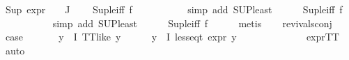 \begin{isabellebody}
\ {\isachardoublequoteopen}Sup\ {\isacharparenleft}{\kern0pt}{\isacharparenleft}{\kern0pt}expr{\isacharunderscore}{\kern0pt}{}\ {\isasymcirc}\ {\isasymPhi}{\isacharparenright}{\kern0pt}\ {\isacharbackquote}{\kern0pt}\ J{\isacharparenright}{\kern0pt}\ {\isasymle}\ {}{\isachardoublequoteclose}\ \isanewline
{}\isamarkupfalse%
\ Sup{\isacharunderscore}{\kern0pt}le{\isacharunderscore}{\kern0pt}iff\ f{}\isanewline
\ \ \ \ \ \ \ \ \ \isamarkupfalse%
\ {\isacharparenleft}{\kern0pt}simp\ add{\isacharcolon}{\kern0pt}\ SUP{\isacharunderscore}{\kern0pt}least{\isacharparenright}{\kern0pt}\isanewline
\ \ \ \ \isamarkupfalse%
\ Sup{\isacharunderscore}{\kern0pt}le{\isacharunderscore}{\kern0pt}iff\ f{}\isanewline
\ \ \ \ \ \ \ \ \ \isamarkupfalse%
\ {\isacharparenleft}{\kern0pt}simp\ add{\isacharcolon}{\kern0pt}\ SUP{\isacharunderscore}{\kern0pt}least{\isacharparenright}{\kern0pt}\isanewline
\ \ \ \ \isamarkupfalse%
\ Sup{\isacharunderscore}{\kern0pt}le{\isacharunderscore}{\kern0pt}iff\ f{}\isanewline
\ \ \ \ \isamarkupfalse%
\ {\isacharparenleft}{\kern0pt}metis{\isacharparenright}{\kern0pt}{\isacharplus}{\kern0pt}\isanewline
\ \ \isamarkupfalse%
\ revivals{\isacharunderscore}{\kern0pt}conj{\isacharparenleft}{\kern0pt}{}{\isacharparenright}{\kern0pt}\ \isamarkupfalse%
\ {\isacharquery}{\kern0pt}case\ \isamarkupfalse%
\isanewline
\ \ \ \ \isamarkupfalse%
\ {\isachardoublequoteopen}{\isasymforall}y{\isasymin}{\isasymPhi}\ {\isacharbackquote}{\kern0pt}\ I{\isachardot}{\kern0pt}\ TT{\isacharunderscore}{\kern0pt}like\ y{\isachardoublequoteclose}\isanewline
\ \ \ \ \isamarkupfalse%
\ {\isachardoublequoteopen}{\isasymforall}y{\isasymin}{\isasymPhi}\ {\isacharbackquote}{\kern0pt}\ I{\isachardot}{\kern0pt}\ less{\isacharunderscore}{\kern0pt}eq{\isacharunderscore}{\kern0pt}t\ {\isacharparenleft}{\kern0pt}expr\ y{\isacharparenright}{\kern0pt}\ {\isacharparenleft}{\kern0pt}{}{\isacharcomma}{\kern0pt}\ {}{\isacharcomma}{\kern0pt}\ {}{\isacharcomma}{\kern0pt}\ {}{\isacharcomma}{\kern0pt}\ {}{\isacharcomma}{\kern0pt}\ {}{\isacharparenright}{\kern0pt}{\isachardoublequoteclose}\isanewline
\ \ \ \ \ \ \isamarkupfalse%
\ expr{\isacharunderscore}{\kern0pt}TT\ \isamarkupfalse%
\ auto\isanewline
\ \ \isamarkupfalse%

\end{isabellebody}
